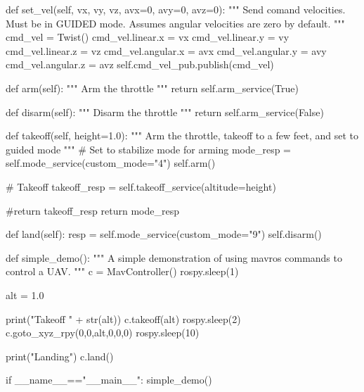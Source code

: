 \documentclass[a4paper,12pt]{article}
\begin{document}
\begin{MyCode}
	def set_vel(self, vx, vy, vz, avx=0, avy=0, avz=0):
		"""
		Send comand velocities. Must be in GUIDED mode. Assumes angular
		velocities are zero by default.
		"""
		cmd_vel = Twist()
		cmd_vel.linear.x = vx
		cmd_vel.linear.y = vy
		cmd_vel.linear.z = vz
		cmd_vel.angular.x = avx
		cmd_vel.angular.y = avy
		cmd_vel.angular.z = avz
		self.cmd_vel_pub.publish(cmd_vel)
		
	def arm(self):
		"""
		Arm the throttle
		"""
		return self.arm_service(True)
		
	def disarm(self):
		"""
		Disarm the throttle
		"""
		return self.arm_service(False)
		
	def takeoff(self, height=1.0):
		"""
		Arm the throttle, takeoff to a few feet, and set to guided mode
		"""
		# Set to stabilize mode for arming
		mode_resp = self.mode_service(custom_mode="4")
		self.arm()
	
		# Takeoff
		takeoff_resp = self.takeoff_service(altitude=height)
		
		#return takeoff_resp
		return mode_resp
		
	def land(self):	
		resp = self.mode_service(custom_mode="9")
		self.disarm()
	
def simple_demo():
	"""
	A simple demonstration of using mavros commands to control a UAV.
	"""
	c = MavController()
	rospy.sleep(1)
	
	alt = 1.0
	
	print("Takeoff " + str(alt))
	c.takeoff(alt)
	rospy.sleep(2)
	c.goto_xyz_rpy(0,0,alt,0,0,0)
	rospy.sleep(10)
	
	print("Landing")
	c.land()
	
if __name__=="__main__":
	simple_demo()

\end{MyCode}
\end{document}
